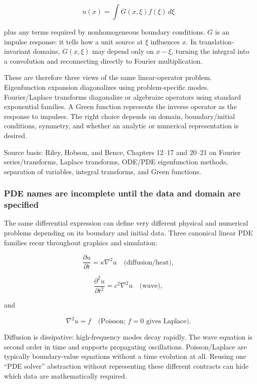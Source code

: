 \[
u(x)
=
\int G(x,\xi)f(\xi)\,d\xi
\]

plus any terms required by nonhomogeneous boundary conditions. \(G\) is an impulse response: it tells how a unit source at \(\xi\) influences \(x\). In translation-invariant domains, \(G(x,\xi)\) may depend only on \(x-\xi\), turning the integral into a convolution and reconnecting directly to Fourier multiplication.

These are therefore three views of the same linear-operator problem. Eigenfunction expansion diagonalizes using problem-specific modes. Fourier/Laplace transforms diagonalize or algebraize operators using standard exponential families. A Green function represents the inverse operator as the response to impulses. The right choice depends on domain, boundary/initial conditions, symmetry, and whether an analytic or numerical representation is desired.

Source basis: Riley, Hobson, and Bence, Chapters 12--17 and 20--21 on Fourier series/transforms, Laplace transforms, ODE/PDE eigenfunction methods, separation of variables, integral transforms, and Green functions.

\subsubsection{PDE names are incomplete until the data and domain are specified}\label{02-foundations-ii-ch025-pde-names-are-incomplete-until-the-data-and-domain-are-specified}

\hypertarget{02-foundations-ii-ch025-pde-names-are-incomplete-until-the-data-and-domain-are-specified}{}

The same differential expression can define very different physical and numerical problems depending on its boundary and initial data. Three canonical linear PDE families recur throughout graphics and simulation:

\[
\frac{\partial u}{\partial t}
=
\kappa\nabla^2u
\quad\text{(diffusion/heat)},
\]

\[
\frac{\partial^2u}{\partial t^2}
=
c^2\nabla^2u
\quad\text{(wave)},
\]

and

\[
\nabla^2u=f
\quad\text{(Poisson; \(f=0\) gives Laplace)}.
\]

Diffusion is dissipative: high-frequency modes decay rapidly. The wave equation is second order in time and supports propagating oscillations. Poisson/Laplace are typically boundary-value equations without a time evolution at all. Reusing one ``PDE solver'' abstraction without representing these different contracts can hide which data are mathematically required.

